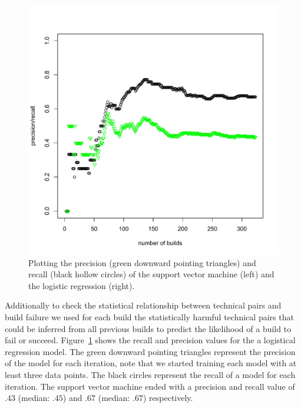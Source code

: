 \documentclass[conference]{IEEEtran}
\begin{document}
\begin{figure}[t]
\centering
\includegraphics[width=\columnwidth]{precision-recall-logreg}
\caption{Plotting the precision (green downward pointing triangles) and recall (black hollow circles) of the support vector machine (left) and the logistic regression (right).}
\label{fig:prediction}
\vspace{-20pt}
\end{figure}

Additionally to check the statistical relationship between technical pairs and build failure we used for each build the statistically harmful technical pairs that could be inferred from all previous builds to predict the likelihood of a build to fail or succeed.
Figure~\ref{fig:prediction} shows the recall and precision values for the
a logistical regression model. The green downward
pointing triangles represent the precision of the model for each iteration, note that we started training each model with at least three data points. The black circles represent the recall of a model for each
iteration.
The support vector machine ended with a precision and recall value of $.43$ (median: $.45$) and $.67$ (median: $.67$) respectively.
\end{document}
